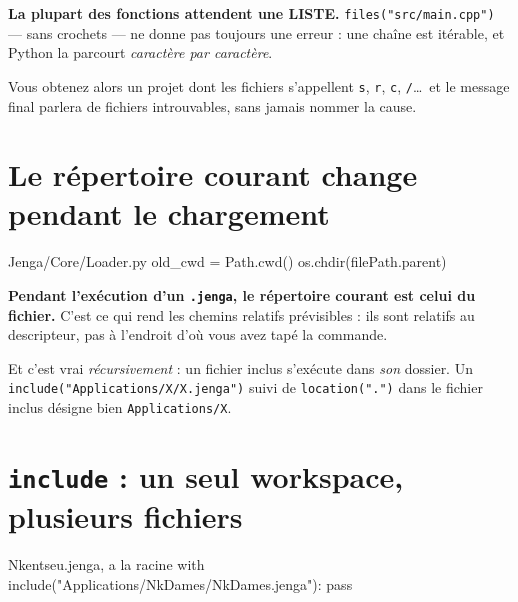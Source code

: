 \begin{nkpiege}
\textbf{La plupart des fonctions attendent une LISTE.} \texttt{files("src/main.cpp")}
--- sans crochets --- ne donne pas toujours une erreur : une chaîne est itérable,
et Python la parcourt \emph{caractère par caractère}.

Vous obtenez alors un projet dont les fichiers s'appellent \texttt{s},
\texttt{r}, \texttt{c}, \texttt{/}\dots\ et le message final parlera de fichiers
introuvables, sans jamais nommer la cause.
\end{nkpiege}

\section{Le répertoire courant change pendant le chargement}

\begin{nkcode}{Jenga/Core/Loader.py}
old_cwd = Path.cwd()
os.chdir(filePath.parent)
\end{nkcode}

\begin{nkretenir}
\textbf{Pendant l'exécution d'un \texttt{.jenga}, le répertoire courant est celui
du fichier.} C'est ce qui rend les chemins relatifs prévisibles : ils sont
relatifs au descripteur, pas à l'endroit d'où vous avez tapé la commande.

Et c'est vrai \emph{récursivement} : un fichier inclus s'exécute dans
\emph{son} dossier. Un \texttt{include("Applications/X/X.jenga")} suivi de
\texttt{location(".")} dans le fichier inclus désigne bien
\texttt{Applications/X}.
\end{nkretenir}

\section{\texttt{include} : un seul workspace, plusieurs fichiers}

\begin{nkcode}{Nkentseu.jenga, a la racine}
with include("Applications/NkDames/NkDames.jenga"):
    pass
\end{nkcode}

